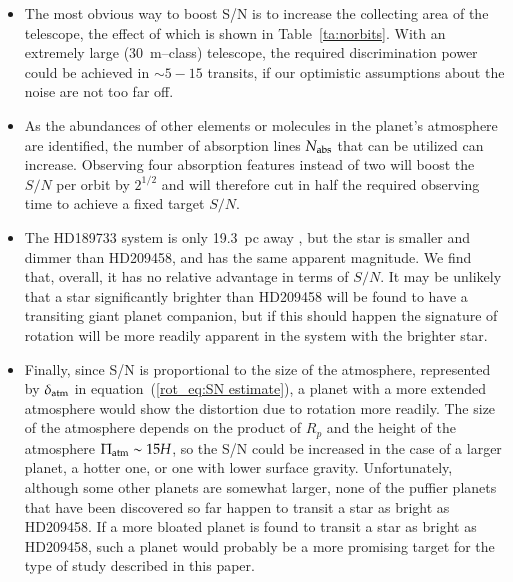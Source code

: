 \begin{itemize}
\item The most obvious way to boost S/N is to increase the collecting
area of the telescope, the effect of which is shown in
Table~\ref{ta:norbits}.  With an extremely large (30~m--class)
telescope, the required discrimination power could be achieved in
$\sim 5-15$ transits, if our optimistic assumptions about the noise
are not too far off.
\item As the abundances of other elements or molecules in the planet's
atmosphere are identified, the number of absorption lines $N_{\rm
abs}$ that can be utilized can increase.  Observing four absorption
features instead of two will boost the $S/N$ per orbit by $2^{1/2}$
and will therefore cut in half the required observing time to achieve
a fixed target $S/N$.
\item The HD189733 system is only 19.3~pc away
\citep{bouchy_et_al2005}, but the star is smaller and dimmer than
HD209458, and has the same apparent magnitude.  We find that, overall,
it has no relative advantage in terms of $S/N$.  It may be unlikely
that a star significantly brighter than HD209458 will be found to have
a transiting giant planet companion, but if this should happen the
signature of rotation will be more readily apparent in the system with
the brighter star.
\item Finally, since S/N is proportional to the size of the
atmosphere, represented by $\delta_{\rm atm}$ in
equation~(\ref{rot_eq:SN estimate}), a planet with a more extended
atmosphere would show the distortion due to rotation more readily.
The size of the atmosphere depends on the product of $R_p$ and the
height of the atmosphere $\Pi_{\rm atm} \sim 15 H$, so the S/N could
be increased in the case of a larger planet, a hotter one, or one with
lower surface gravity.  Unfortunately, although some other planets are
somewhat larger, none of the puffier planets that have been discovered
so far happen to transit a star as bright as HD209458.  If a more
bloated planet is found to transit a star as bright as HD209458, such
a planet would probably be a more promising target for the type of
study described in this paper.
\end{itemize}

